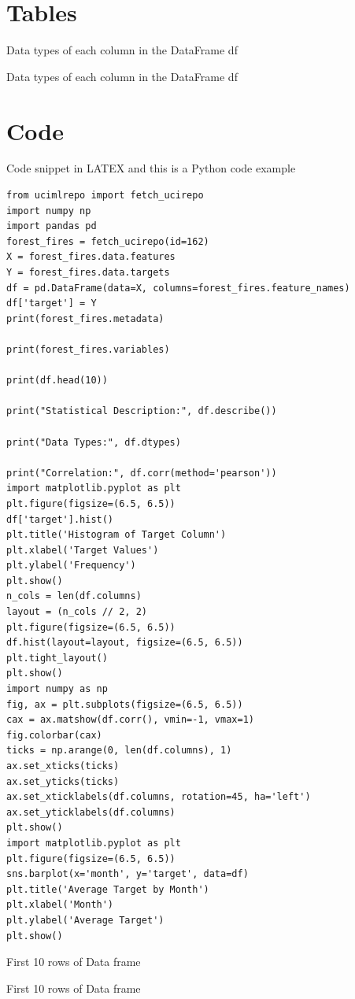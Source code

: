 \section{Tables}
Data types of each column in the DataFrame df \\
\begin{table}[ht!]
    \centering
    
    \label{tab:Datatypes}
    \caption{Data types of each column in the DataFrame df}
\end{table}

\clearpage
\section{Code}
Code snippet in LATEX and this is a Python code example
\begin{lstlisting}
from ucimlrepo import fetch_ucirepo
import numpy np
import pandas pd
forest_fires = fetch_ucirepo(id=162)
X = forest_fires.data.features
Y = forest_fires.data.targets
df = pd.DataFrame(data=X, columns=forest_fires.feature_names)
df['target'] = Y
print(forest_fires.metadata)

print(forest_fires.variables)

print(df.head(10))

print("Statistical Description:", df.describe())

print("Data Types:", df.dtypes)

print("Correlation:", df.corr(method='pearson'))
import matplotlib.pyplot as plt
plt.figure(figsize=(6.5, 6.5))
df['target'].hist()
plt.title('Histogram of Target Column')
plt.xlabel('Target Values')
plt.ylabel('Frequency')
plt.show()
n_cols = len(df.columns)
layout = (n_cols // 2, 2)
plt.figure(figsize=(6.5, 6.5))
df.hist(layout=layout, figsize=(6.5, 6.5))
plt.tight_layout()
plt.show()
import numpy as np
fig, ax = plt.subplots(figsize=(6.5, 6.5))
cax = ax.matshow(df.corr(), vmin=-1, vmax=1)
fig.colorbar(cax)
ticks = np.arange(0, len(df.columns), 1)
ax.set_xticks(ticks)
ax.set_yticks(ticks)
ax.set_xticklabels(df.columns, rotation=45, ha='left')
ax.set_yticklabels(df.columns)
plt.show()
import matplotlib.pyplot as plt
plt.figure(figsize=(6.5, 6.5))
sns.barplot(x='month', y='target', data=df)
plt.title('Average Target by Month')
plt.xlabel('Month')
plt.ylabel('Average Target')
plt.show()
\end{lstlisting}

\clearpage
First 10 rows of Data frame
\begin{table}[ht!]
    \centering
    
    \label{tab:DataFrame}
    \caption{First 10 rows of Data frame}
\end{table}

